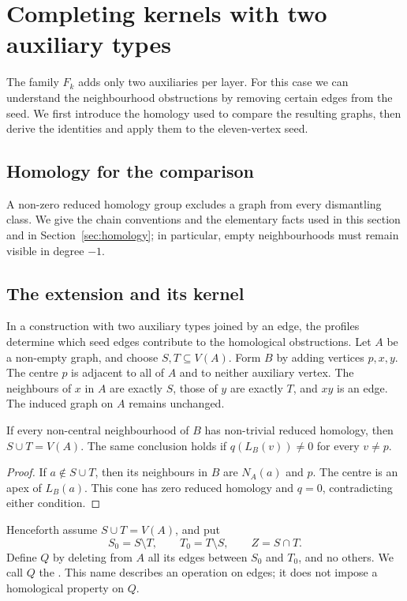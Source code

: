 \section{Completing kernels with two auxiliary types}\label{sec:kernels}
The family $F_k$ adds only two auxiliaries per layer. For this case we can
understand the neighbourhood obstructions by removing certain edges from the
seed. We first introduce the homology used to compare the resulting graphs,
then derive the identities and apply them to the eleven-vertex seed.

\subsection{Homology for the comparison}\label{sec:homological-tools}
A non-zero reduced homology group excludes a graph from every dismantling
class. We give the chain conventions and the elementary facts used in this
section and in Section~\ref{sec:homology}; in particular, empty
neighbourhoods must remain visible in degree $-1$.


\subsection{The extension and its kernel}
In a construction with two auxiliary types joined by an edge, the profiles
determine which seed edges contribute to the homological obstructions.
Let \(A\) be a non-empty graph, and choose \(S,T\subseteq V(A)\).
Form \(B\) by adding vertices \(p,x,y\). The centre \(p\) is adjacent
to all of \(A\) and to neither auxiliary vertex. The neighbours of \(x\) in \(A\) are exactly \(S\), those of \(y\) are exactly \(T\), and \(xy\) is an edge.
The induced graph on \(A\) remains unchanged.

\begin{lemma}\label{ker:lem:cover}
If every non-central neighbourhood of \(B\) has non-trivial
reduced homology, then \(S\cup T=V(A)\).
The same conclusion holds if \(q(L_B(v))\ne0\) for every
\(v\ne p\).
\end{lemma}
\begin{proof}
If \(a\notin S\cup T\), then its neighbours in \(B\) are \(N_A(a)\)
and \(p\). The centre is an apex of \(L_B(a)\).
This cone has zero reduced homology and \(q=0\), contradicting
either condition.
\end{proof}

Henceforth assume \(S\cup T=V(A)\), and put
\[
 S_0=S\setminus T,\qquad T_0=T\setminus S,\qquad Z=S\cap T.
\]
Define \(Q\) by deleting from \(A\) all its edges between \(S_0\)
and \(T_0\), and no others. We call \(Q\) the . This name describes an operation on edges; it does
not impose a homological property on \(Q\).

